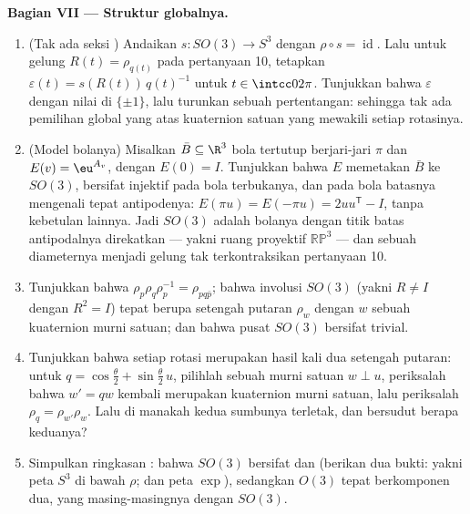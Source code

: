 \begin{problem}
\medskip
\noindent\textbf{Bagian VII --- Struktur globalnya.}
\begin{enumerate}[resume]
  \item (Tak ada seksi ) Andaikan $s \colon SO(3) \to
        S^3$  dengan $\rho \circ s =
        \operatorname{id}$. Lalu untuk gelung $R(t) =
        \rho_{q(t)}$ pada pertanyaan 10, tetapkan $\varepsilon(t) =
        s(R(t))\,q(t)^{-1}$ untuk $t \in \intcc0{2\pi}$. Tunjukkan
        bahwa $\varepsilon$  dengan nilai di
        $\{\pm1\}$, lalu turunkan sebuah pertentangan: sehingga tak ada
        pemilihan global yang  atas kuaternion satuan yang
        mewakili setiap rotasinya.
  \item (Model bolanya) Misalkan $\bar B \subseteq \R^3$ bola
        tertutup berjari-jari $\pi$ dan $E(v) = \eu^{A_v}$,
        dengan $E(0) = I$. Tunjukkan bahwa $E$ memetakan $\bar B$ ke
        $SO(3)$, bersifat injektif pada bola terbukanya, dan pada
        bola batasnya mengenali tepat antipodenya:
        $E(\pi u) = E(-\pi u) = 2uu^{\mathsf T} - I$, tanpa
        kebetulan lainnya. Jadi $SO(3)$ adalah bolanya
        dengan titik batas antipodalnya direkatkan --- yakni
        ruang proyektif $\mathbb{RP}^3$ --- dan sebuah diameternya
        menjadi gelung tak terkontraksikan pertanyaan 10.
  \item Tunjukkan bahwa $\rho_p\rho_q\rho_p^{-1} = \rho_{pq\bar
        p}$; bahwa involusi $SO(3)$ (yakni $R \neq
        I$ dengan $R^2 = I$) tepat berupa setengah putaran
        $\rho_w$ dengan $w$ sebuah kuaternion murni satuan; dan bahwa
        pusat $SO(3)$ bersifat trivial.
  \item Tunjukkan bahwa setiap rotasi merupakan hasil kali dua
        setengah putaran: untuk $q = \cos\frac\theta2 +
        \sin\frac\theta2\,u$, pilihlah sebuah murni satuan $w \perp
        u$, periksalah bahwa $w' = qw$ kembali merupakan kuaternion
        murni satuan, lalu periksalah $\rho_q =
        \rho_{w'}\rho_w$. Lalu di manakah kedua sumbunya terletak, dan
        bersudut berapa keduanya?
  \item Simpulkan ringkasan : bahwa $SO(3)$ bersifat
         dan  (berikan dua bukti:
        yakni peta  $S^3$ di bawah $\rho$; dan peta
        $\exp$), sedangkan $O(3)$ tepat berkomponen 
        dua, yang masing-masingnya  dengan $SO(3)$.


\end{enumerate}
\end{problem}

